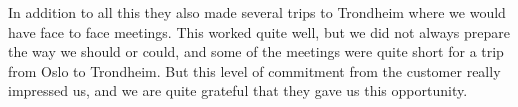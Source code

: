 In addition to all this they also made several trips to Trondheim where we would have face to face meetings. This worked quite well, but we did not always prepare the way we should or could, and some of the meetings were quite short for a trip from Oslo to Trondheim. But this level of commitment from the customer really impressed us, and we are quite grateful that they gave us this opportunity.
\\

